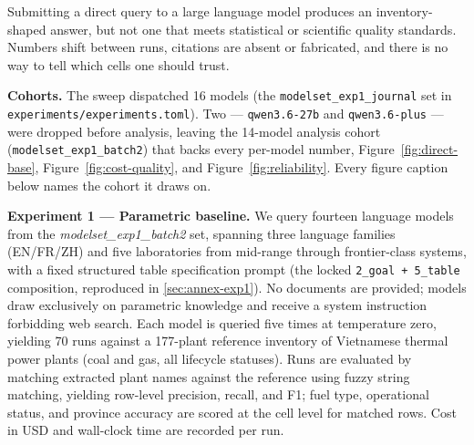 \documentclass[a4paper,11pt]{article}
\begin{document}
Submitting a direct query to a large language model produces an
inventory-shaped answer, but not one that meets statistical or
scientific quality standards. Numbers shift between runs, citations are
absent or fabricated, and there is no way to tell which cells one should
trust.

\textbf{Cohorts.} The sweep dispatched 16 models (the
\texttt{modelset\_exp1\_journal} set in
\texttt{experiments/experiments.toml}). Two --- \texttt{qwen3.6-27b} and
\texttt{qwen3.6-plus} --- were dropped before analysis, leaving the
14-model analysis cohort (\texttt{modelset\_exp1\_batch2}) that backs
every per-model number, Figure~\ref{fig:direct-base},
Figure~\ref{fig:cost-quality}, and Figure~\ref{fig:reliability}. Every
figure caption below names the cohort it draws on.

\textbf{Experiment 1 --- Parametric baseline.} We query fourteen
language models from the \emph{modelset\_exp1\_batch2} set, spanning
three language families (EN/FR/ZH) and five laboratories from mid-range
through frontier-class systems, with a fixed structured table
specification prompt (the locked \texttt{2\_goal\ +\ 5\_table}
composition, reproduced in \ref{sec:annex-exp1}). No documents are
provided; models draw exclusively on parametric knowledge and receive a
system instruction forbidding web search. Each model is queried five
times at temperature zero, yielding 70 runs against a 177-plant
reference inventory of Vietnamese thermal power plants (coal and gas,
all lifecycle statuses). Runs are evaluated by matching extracted plant
names against the reference using fuzzy string matching, yielding
row-level precision, recall, and F1; fuel type, operational status, and
province accuracy are scored at the cell level for matched rows. Cost in
USD and wall-clock time are recorded per run.
\end{document}
